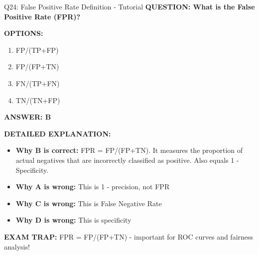 \documentclass[8pt]{beamer}
\begin{document}
	\begin{frame}{Q24: False Positive Rate Definition - Tutorial}
		\fontsize{6.5}{7.5}\selectfont
		\textbf{QUESTION: What is the False Positive Rate (FPR)?}
		
		\vspace{0.1cm}
		\textbf{OPTIONS:}
		\begin{enumerate}
			\item FP/(TP+FP)
			\item FP/(FP+TN)
			\item FN/(TP+FN)
			\item TN/(TN+FP)
		\end{enumerate}
		
		\vspace{0.1cm}
		\textcolor{myblue}{\textbf{ANSWER: B}}
		
		\vspace{0.1cm}
		\textbf{DETAILED EXPLANATION:}
		\begin{itemize}
			\item \textbf{Why B is correct:} FPR = FP/(FP+TN). It measures the proportion of actual negatives that are incorrectly classified as positive. Also equals 1 - Specificity.
			\item \textbf{Why A is wrong:} This is 1 - precision, not FPR
			\item \textbf{Why C is wrong:} This is False Negative Rate
			\item \textbf{Why D is wrong:} This is specificity
		\end{itemize}
		
		\textcolor{myred}{\textbf{EXAM TRAP:}} FPR = \textcolor{myblue}{FP/(FP+TN)} - important for ROC curves and fairness analysis!
	\end{frame}
	
\end{document}
